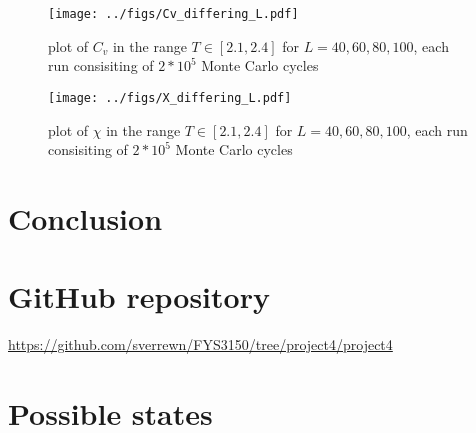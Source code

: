 \documentclass[english,notitlepage,reprint,nofootinbib]{revtex4-1}  %
\begin{document}
\begin{figure}[H]
	\centering
	\texttt{[image: ../figs/Cv\_differing\_L.pdf]} %
	\caption{plot of $C_v$ in the range $T \in [2.1,2.4]$ for $L=40,60,80,100$, each run consisiting of $2*10^5$ Monte Carlo cycles}
	\label{fig:Cv_diff_l}
\end{figure}

\begin{figure}[H]
	\centering
	\texttt{[image: ../figs/X\_differing\_L.pdf]} %
	\caption{plot of $\chi$ in the range $T \in [2.1,2.4]$ for $L=40,60,80,100$, each run consisiting of $2*10^5$ Monte Carlo cycles}
	\label{fig:X_diff_l}
\end{figure}
%

 
\section{Conclusion}\label{sec:conclusion}



%


\onecolumngrid

\newpage

\appendix

\section{GitHub repository}

\centering
\url{https://github.com/sverrewn/FYS3150/tree/project4/project4} 

\section{Possible states} \label{eq_motion}
\end{document}
